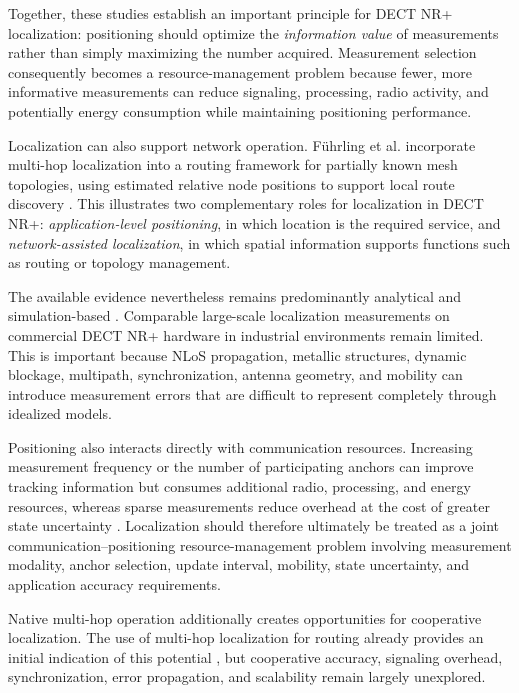 Together, these studies establish an important principle for DECT NR+ localization: positioning should optimize the \emph{information value} of measurements rather than simply maximizing the number acquired. Measurement selection consequently becomes a resource-management problem because fewer, more informative measurements can reduce signaling, processing, radio activity, and potentially energy consumption while maintaining positioning performance.

Localization can also support network operation. F{\"u}hrling et al. incorporate multi-hop localization into a routing framework for partially known mesh topologies, using estimated relative node positions to support local route discovery \cite{fuhrlingRobustRoutingProtocol2025b}. This illustrates two complementary roles for localization in DECT NR+: \emph{application-level positioning}, in which location is the required service, and \emph{network-assisted localization}, in which spatial information supports functions such as routing or topology management.

The available evidence nevertheless remains predominantly analytical and simulation-based \cite{saikkoPositioningDECT2020NR2024, saikkoPositioningTrackingDECT20202025}. Comparable large-scale localization measurements on commercial DECT NR+ hardware in industrial environments remain limited. This is important because NLoS propagation, metallic structures, dynamic blockage, multipath, synchronization, antenna geometry, and mobility can introduce measurement errors that are difficult to represent completely through idealized models.

Positioning also interacts directly with communication resources. Increasing measurement frequency or the number of participating anchors can improve tracking information but consumes additional radio, processing, and energy resources, whereas sparse measurements reduce overhead at the cost of greater state uncertainty \cite{saikkoPositioningDECT2020NR2024, saikkoPositioningTrackingDECT20202025}. Localization should therefore ultimately be treated as a joint communication--positioning resource-management problem involving measurement modality, anchor selection, update interval, mobility, state uncertainty, and application accuracy requirements.

Native multi-hop operation additionally creates opportunities for cooperative localization. The use of multi-hop localization for routing already provides an initial indication of this potential \cite{fuhrlingRobustRoutingProtocol2025b}, but cooperative accuracy, signaling overhead, synchronization, error propagation, and scalability remain largely unexplored.

